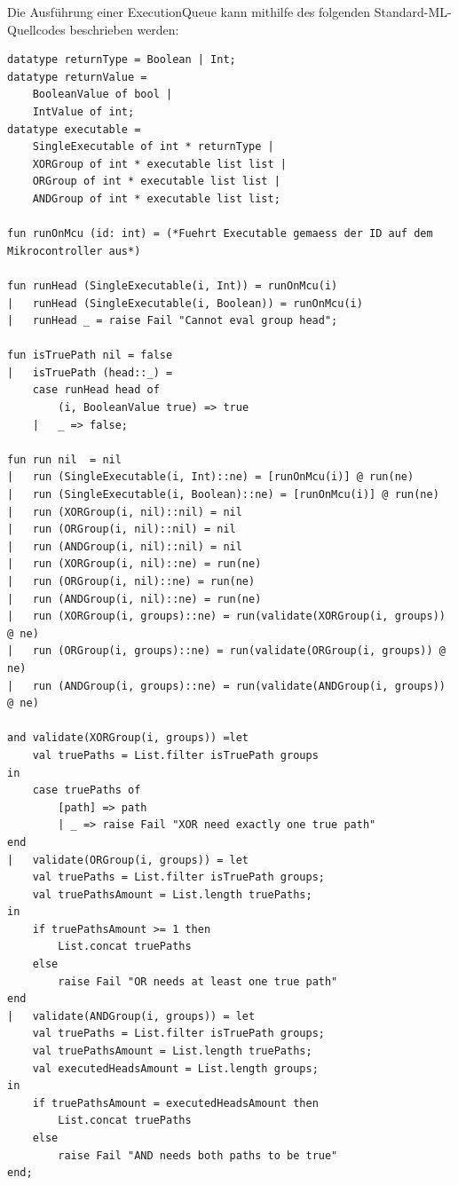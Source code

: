 \noindent Die Ausführung einer ExecutionQueue kann mithilfe des folgenden Standard-ML-Quellcodes \cite{smolka_programmierung_2012}
beschrieben werden:

\begin{lstlisting}
datatype returnType = Boolean | Int;
datatype returnValue = 
    BooleanValue of bool |
    IntValue of int;
datatype executable = 
    SingleExecutable of int * returnType |
    XORGroup of int * executable list list |
    ORGroup of int * executable list list | 
    ANDGroup of int * executable list list;

fun runOnMcu (id: int) = (*Fuehrt Executable gemaess der ID auf dem Mikrocontroller aus*)

fun runHead (SingleExecutable(i, Int)) = runOnMcu(i)
|   runHead (SingleExecutable(i, Boolean)) = runOnMcu(i)
|   runHead _ = raise Fail "Cannot eval group head";

fun isTruePath nil = false
|   isTruePath (head::_) = 
    case runHead head of 
        (i, BooleanValue true) => true
    |   _ => false;

fun run nil  = nil 
|   run (SingleExecutable(i, Int)::ne) = [runOnMcu(i)] @ run(ne)
|   run (SingleExecutable(i, Boolean)::ne) = [runOnMcu(i)] @ run(ne)
|   run (XORGroup(i, nil)::nil) = nil
|   run (ORGroup(i, nil)::nil) = nil
|   run (ANDGroup(i, nil)::nil) = nil
|   run (XORGroup(i, nil)::ne) = run(ne)
|   run (ORGroup(i, nil)::ne) = run(ne)
|   run (ANDGroup(i, nil)::ne) = run(ne)
|   run (XORGroup(i, groups)::ne) = run(validate(XORGroup(i, groups)) @ ne)
|   run (ORGroup(i, groups)::ne) = run(validate(ORGroup(i, groups)) @ ne)
|   run (ANDGroup(i, groups)::ne) = run(validate(ANDGroup(i, groups)) @ ne)

and validate(XORGroup(i, groups)) =let
    val truePaths = List.filter isTruePath groups
in
    case truePaths of
        [path] => path
        | _ => raise Fail "XOR need exactly one true path"
end
|   validate(ORGroup(i, groups)) = let
    val truePaths = List.filter isTruePath groups;
    val truePathsAmount = List.length truePaths;
in
    if truePathsAmount >= 1 then
        List.concat truePaths
    else
        raise Fail "OR needs at least one true path"
end
|   validate(ANDGroup(i, groups)) = let
    val truePaths = List.filter isTruePath groups;
    val truePathsAmount = List.length truePaths;
    val executedHeadsAmount = List.length groups;
in
    if truePathsAmount = executedHeadsAmount then
        List.concat truePaths
    else
        raise Fail "AND needs both paths to be true"
end;
\end{lstlisting}

